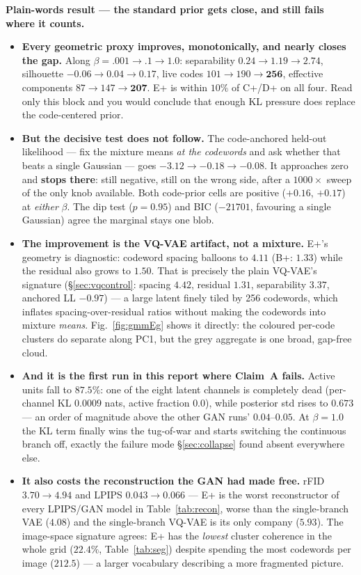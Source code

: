 \documentclass[11pt]{article}
\begin{document}
\textbf{Plain-words result --- the standard prior gets close, and still fails where it counts.}
\begin{itemize}
  \item \textbf{Every geometric proxy improves, monotonically, and nearly closes the gap.}
  Along $\beta=.001\to.1\to1.0$: separability $0.24\to1.19\to\mathbf{2.74}$, silhouette
  $-0.06\to0.04\to\mathbf{0.17}$, live codes $101\to190\to\mathbf{256}$, effective components
  $87\to147\to\mathbf{207}$. E+ is within $10\%$ of C+/D+ on all four. Read only this block and you
  would conclude that enough KL pressure does replace the code-centered prior.
  \item \textbf{But the decisive test does not follow.} The code-anchored held-out likelihood ---
  fix the mixture means \emph{at the codewords} and ask whether that beats a single Gaussian ---
  goes $-3.12\to-0.18\to\mathbf{-0.08}$. It approaches zero and \textbf{stops there}: still
  negative, still on the wrong side, after a $1000\times$ sweep of the only knob available. Both
  code-prior cells are positive ($+0.16$, $+0.17$) at \emph{either} $\beta$. The dip test
  ($p=0.95$) and BIC ($-21701$, favouring a single Gaussian) agree the marginal stays one blob.
  \item \textbf{The improvement is the VQ-VAE artifact, not a mixture.} E+'s geometry is
  diagnostic: codeword spacing balloons to $4.11$ (B+: $1.33$) while the residual also grows to
  $1.50$. That is precisely the plain VQ-VAE's signature (\S\ref{sec:vqcontrol}: spacing $4.42$,
  residual $1.31$, separability $3.37$, anchored LL $-0.97$) --- a large latent finely tiled by
  256 codewords, which inflates spacing-over-residual ratios without making the codewords into
  mixture \emph{means}. Fig.~\ref{fig:gmmEg} shows it directly: the coloured per-code clusters do
  separate along PC1, but the grey aggregate is one broad, gap-free cloud.
  \item \textbf{And it is the first run in this report where Claim~A fails.}
  Active units fall to $\mathbf{87.5\%}$: one of the eight latent channels is completely dead
  (per-channel KL $0.0009$ nats, active fraction $0.0$), while posterior std rises to $0.673$ ---
  an order of magnitude above the other GAN runs' $0.04$--$0.05$. At $\beta=1.0$ the KL term
  finally wins the tug-of-war and starts switching the continuous branch off, exactly the
  failure mode \S\ref{sec:collapse} found absent everywhere else.
  \item \textbf{It also costs the reconstruction the GAN had made free.} rFID $3.70\to4.94$ and
  LPIPS $0.043\to0.066$ --- E+ is the worst reconstructor of every LPIPS/GAN model in
  Table~\ref{tab:recon}, worse than the single-branch VAE ($4.08$) and the single-branch
  VQ-VAE is its only company ($5.93$). The image-space signature agrees: E+ has the \emph{lowest}
  cluster coherence in the whole grid ($22.4\%$, Table~\ref{tab:seg}) despite spending the most
  codewords per image ($212.5$) --- a larger vocabulary describing a more fragmented picture.
\end{itemize}
\end{document}
